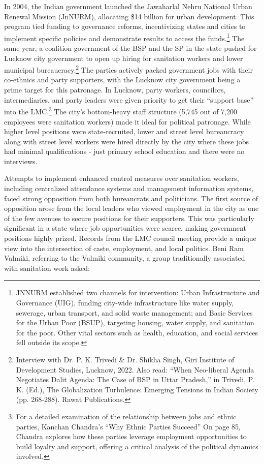 In 2004, the Indian government launched the Jawaharlal Nehru National Urban Renewal Mission (JnNURM), allocating \$14 billion for urban development. This program tied funding to governance reforms, incentivizing states and cities to implement specific policies and demonstrate results to access the funds.\footnote{JNNURM established two channels for intervention: Urban Infrastructure and Governance (UIG), funding city-wide infrastructure like water supply, sewerage, urban transport, and solid waste management; and Basic Services for the Urban Poor (BSUP), targeting housing, water supply, and sanitation for the poor. Other vital sectors such as health, education, and social services fell outside its scope.} The same year, a coalition government of the BSP and the SP in the state pushed for Lucknow city government to open up hiring for sanitation workers and lower municipal bureaucracy.\footnote{Interview with Dr. P. K. Trivedi \& Dr. Shikha Singh, Giri Institute of Development Studies, Lucknow, 2022. Also read: ``When Neo-liberal Agenda Negotiates Dalit Agenda: The Case of BSP in Uttar Pradesh,'' in Trivedi, P. K. (Ed.), The Globalization Turbulence: Emerging Tensions in Indian Society (pp. 268-288). Rawat Publications.} The parties actively packed government jobs with their co-ethnics and party supporters, with the Lucknow city government being a prime target for this patronage. In Lucknow, party workers, councilors, intermediaries, and party leaders were given priority to get their ``support base'' into the LMC.\footnote{For a detailed examination of the relationship between jobs and ethnic parties, Kanchan Chandra's ``Why Ethnic Parties Succeed'' On page 85, Chandra explores how these parties leverage employment opportunities to build loyalty and support, offering a critical analysis of the political dynamics involved.} The city's bottom-heavy staff structure (5,745 out of 7,200 employees were sanitation workers) made it ideal for political patronage. While higher level positions were state-recruited, lower and street level bureaucracy along with street level workers were hired directly by the city where these jobs had minimal qualifications - just primary school education and there were no interviews.

Attempts to implement enhanced control measures over sanitation workers, including centralized attendance systems and management information systems, faced strong opposition from both bureaucrats and politicians. The first source of opposition arose from the local leaders who viewed employment in the city as one of the few avenues to secure positions for their supporters. This was particularly significant in a state where job opportunities were scarce, making government positions highly prized. Records from the LMC council meeting provide a unique view into the intersection of caste, employment, and local politics. Beni Ram Valmiki, referring to the Valmiki community, a group traditionally associated with sanitation work asked:

